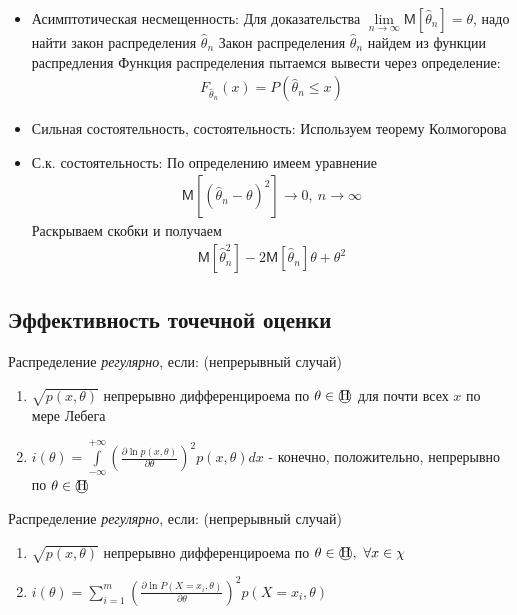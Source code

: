 \documentclass[12pt]{article}
\newcommand{\M}{\mathsf{M}}
\begin{document}
\begin{itemize}
    \itemsep0em
    \item Асимптотическая несмещенность:
        \subitem Для доказательства $\lim\limits_{n\rightarrow \infty}\M
        [\widehat{\theta}_{n}]=\theta$, надо найти закон распределения
        $\widehat{\theta}_{n}$
        \subitem Закон распределения $\widehat{\theta}_{n}$ найдем из
        функции распредления
        \subitem Функция распределения пытаемся вывести через
        определение:
        \begin{eqnarray*}
            F_{\widehat{\theta}_{n}}(x)=P(\widehat{\theta}_{n}\leqslant x)
        \end{eqnarray*}
    \item Сильная состоятельность, состоятельность: Используем теорему Колмогорова
    \item С.к. состоятельность:
        \subitem По определению имеем уравнение
        \begin{eqnarray*}
            \M [(\widehat{\theta}_{n}-\theta)^{2}] \to 0,\ n\to\infty
        \end{eqnarray*}
        \subitem Раскрываем скобки и получаем
        \begin{eqnarray*}
            \M [\widehat{\theta}_{n}^{2}]-2\M
            [\widehat{\theta}_{n}]\theta +\theta^{2}
        \end{eqnarray*}
\end{itemize}

\subsection{Эффективность точечной оценки}

\par Распределение \textit{регулярно}, если: (непрерывный случай)
\begin{enumerate}
    \itemsep0em
    \item $\sqrt{p(x,\theta)}$ непрерывно дифференцироема по $\theta\in
        \textmd{\textcircled{H}}$ для почти всех $x$ по мере Лебега
    \item $i(\theta)=\int\limits_{-\infty}^{+\infty}
        \left(\frac{\partial\ln
        p(x,\theta)}{\partial\theta}\right)^{2}p(x,\theta)dx$ - конечно,
        положительно, непрерывно по $\theta\in \textmd{\textcircled{H}}$
\end{enumerate}

\par Распределение \textit{регулярно}, если: (непрерывный случай)
\begin{enumerate}
    \itemsep0em
    \item $\sqrt{p(x,\theta)}$ непрерывно дифференцироема по $\theta\in
        \textmd{\textcircled{H}},\ \forall x\in\chi$
    \item $i(\theta)=\sum\limits_{i=1}^{m}
        \left(\frac{\partial\ln
        P(X=x_{i},\theta)}{\partial\theta}\right)^{2}
        p(X=x_{i},\theta)$
\end{enumerate}
\end{document}
